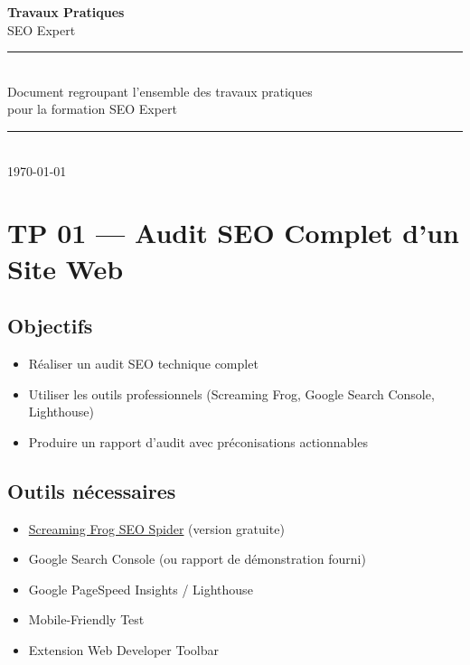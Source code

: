 \documentclass[12pt,a4paper]{report}
\begin{document}
\begin{titlepage}
\begin{center}
\vspace*{5cm}
{\Huge \textbf{Travaux Pratiques}}\\[1cm]
{\LARGE SEO Expert}\\[2cm]
\rule{\textwidth}{0.5pt}\\[1cm]
{\large Document regroupant l'ensemble des travaux pratiques}\\
{\large pour la formation SEO Expert}\\[2cm]
\rule{\textwidth}{0.5pt}\\[2cm]
{\large \today}
\end{center}
\end{titlepage}

\tableofcontents
\newpage

\chapter{TP 01 --- Audit SEO Complet d'un Site Web}

\section{Objectifs}
\begin{itemize}
\item Réaliser un audit SEO technique complet
\item Utiliser les outils professionnels (Screaming Frog, Google Search Console, Lighthouse)
\item Produire un rapport d'audit avec préconisations actionnables
\end{itemize}

\section{Outils nécessaires}
\begin{itemize}
\item \href{https://www.screamingfrog.co.uk/seo-spider/}{Screaming Frog SEO Spider} (version gratuite)
\item Google Search Console (ou rapport de démonstration fourni)
\item Google PageSpeed Insights / Lighthouse
\item Mobile-Friendly Test
\item Extension Web Developer Toolbar
\end{itemize}
\end{document}
